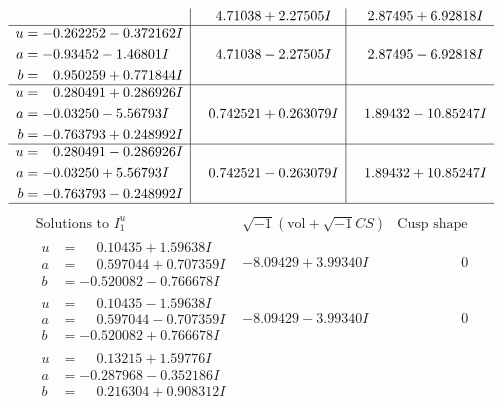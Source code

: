 \documentclass[1p]{elsarticle_modified}
\theoremstyle{definition}
\newcommand{\I}{\sqrt{-1}}
\begin{document}
$$\begin{array}{c|c|c}
 & \phantom{-}4.71038 + 2.27505 I & \phantom{-}2.87495 + 6.92818 I \\ \hline\begin{aligned}
u &= -0.262252 - 0.372162 I \\
a &= -0.93452 - 1.46801 I \\
b &= \phantom{-}0.950259 + 0.771844 I\end{aligned}
 & \phantom{-}4.71038 - 2.27505 I & \phantom{-}2.87495 - 6.92818 I \\ \hline\begin{aligned}
u &= \phantom{-}0.280491 + 0.286926 I \\
a &= -0.03250 - 5.56793 I \\
b &= -0.763793 + 0.248992 I\end{aligned}
 & \phantom{-}0.742521 + 0.263079 I & \phantom{-}1.89432 - 10.85247 I \\ \hline\begin{aligned}
u &= \phantom{-}0.280491 - 0.286926 I \\
a &= -0.03250 + 5.56793 I \\
b &= -0.763793 - 0.248992 I\end{aligned}
 & \phantom{-}0.742521 - 0.263079 I & \phantom{-}1.89432 + 10.85247 I\\
 \hline 
 \end{array}$$\newpage$$\begin{array}{c|c|c}  
\text{Solutions to }I^u_{1}& \I (\text{vol} + \sqrt{-1}CS) & \text{Cusp shape}\\
 \hline 
\begin{aligned}
u &= \phantom{-}0.10435 + 1.59638 I \\
a &= \phantom{-}0.597044 + 0.707359 I \\
b &= -0.520082 - 0.766678 I\end{aligned}
 & -8.09429 + 3.99340 I & \phantom{-0.000000 } 0 \\ \hline\begin{aligned}
u &= \phantom{-}0.10435 - 1.59638 I \\
a &= \phantom{-}0.597044 - 0.707359 I \\
b &= -0.520082 + 0.766678 I\end{aligned}
 & -8.09429 - 3.99340 I & \phantom{-0.000000 } 0 \\ \hline\begin{aligned}
u &= \phantom{-}0.13215 + 1.59776 I \\
a &= -0.287968 - 0.352186 I \\
b &= \phantom{-}0.216304 + 0.908312 I\end{aligned}

\end{array}$$
\end{document}
